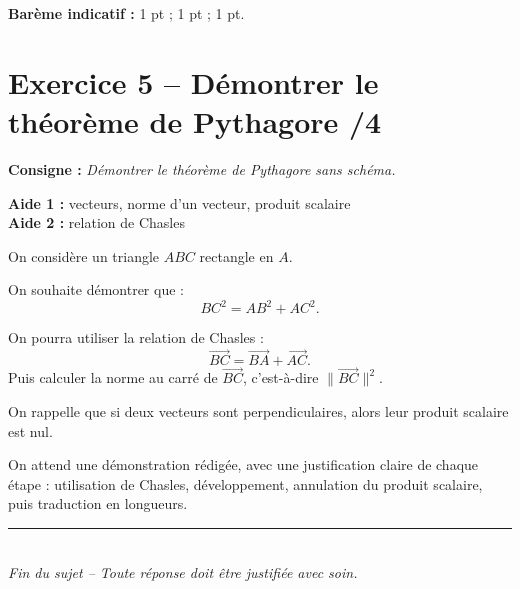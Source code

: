 \documentclass[11pt,a4paper]{article}
\begin{document}
\vspace{0.6em}
\textbf{Barème indicatif :} 1 pt ; 1 pt ; 1 pt.

\section*{Exercice 5 -- Démontrer le théorème de Pythagore \hfill /4}

\textbf{Consigne :} \emph{Démontrer le théorème de Pythagore sans schéma.}

\medskip

\textbf{Aide 1 :} vecteurs, norme d'un vecteur, produit scalaire\\
\textbf{Aide 2 :} relation de Chasles

\medskip

On considère un triangle \(ABC\) rectangle en \(A\).

On souhaite démontrer que :
\[
BC^2=AB^2+AC^2.
\]

\begin{tcolorbox}[title=Indications]
On pourra utiliser la relation de Chasles :
\[
\overrightarrow{BC}=\overrightarrow{BA}+\overrightarrow{AC}.
\]
Puis calculer la norme au carré de \(\overrightarrow{BC}\), c'est-à-dire \(\|\overrightarrow{BC}\|^2\).

On rappelle que si deux vecteurs sont perpendiculaires, alors leur produit scalaire est nul.
\end{tcolorbox}



\begin{tcolorbox}[title=Attendus]
On attend une démonstration rédigée, avec une justification claire de chaque étape : utilisation de Chasles, développement, annulation du produit scalaire, puis traduction en longueurs.
\end{tcolorbox}

\vspace{0.6em}


\vfill

\begin{center}
    \rule{0.8\textwidth}{0.6pt}\\[0.4em]
    \textit{Fin du sujet -- Toute réponse doit être justifiée avec soin.}
\end{center}
\end{document}

